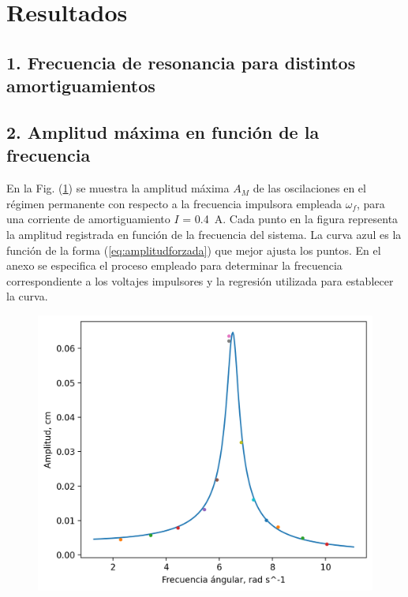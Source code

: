 \section*{Resultados}
\subsection*{1. Frecuencia de resonancia para distintos amortiguamientos}

\vspace{1cm}



\subsection*{2. Amplitud máxima en función de la frecuencia}

En la Fig. (\ref{fig:amplitudfrecuencia}) se muestra la amplitud máxima $A_M$ de las 
oscilaciones en el régimen permanente con respecto a la frecuencia impulsora empleada 
$\omega_f$, para una corriente de amortiguamiento $I$ = \qty{0,4}{\ampere}. Cada punto en la
figura representa la amplitud registrada en función de la frecuencia del sistema. La curva 
azul es la función de la forma (\ref{eq:amplitudforzada}) que mejor ajusta los puntos. En el
anexo se especifica el proceso empleado para determinar la frecuencia correspondiente a los
voltajes impulsores y la regresión utilizada para establecer la curva.
\begin{figure}[H]
	\centering
	\includegraphics[width=\linewidth]{results/res/reso.png}
	\label{fig:amplitudfrecuencia}
\end{figure}